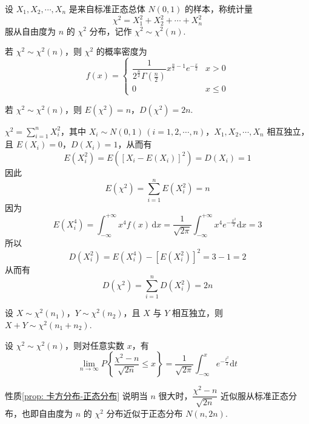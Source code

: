 \begin{definition} \label{def: 卡方分布}
    设 $X_1, X_2, \cdots, X_n$ 是来自标准正态总体 $N(0,1)$ 的样本，称统计量
    $$
    \chi^2 = X_1^2 + X_2^2 + \cdots + X_n^2
    $$
    服从自由度为 $n$ 的 $\chi^2$ 分布，记作 $\chi^2 \sim \chi^2(n)$.
\end{definition}

若 $\chi^2 \sim \chi^2(n)$，则 $\chi^2$ 的概率密度为
$$
f(x) = \begin{cases}
    \dfrac{1}{2^{\frac{n}{2}} \Gamma(\frac{n}{2})} x^{\frac{n}{2} - 1} e^{-\frac{x}{2}} & x>0 \\
    0 & x \leqslant 0
\end{cases}
$$

\setcounter{propertyname}{0}

\begin{property} \label{prop:卡方分布的数学期望和方差}
    若 $\chi^2 \sim \chi^2(n)$，则 $E(\chi^2) = n$，$D(\chi^2) = 2n$.
\end{property}

\begin{myproof}
    $\chi^2 = \displaystyle\sum_{i=1}^n X_i^2$，其中 $X_i \sim N(0,1) \, (i=1,2,\cdots,n)$，$X_1, X_2, \cdots, X_n$ 相互独立，且 $E(X_i) = 0$，$D(X_i) = 1$，从而有
    $$
    E(X_i^2) = E([X_i - E(X_i)]^2) = D(X_i) = 1
    $$
    因此
    $$
    E(\chi^2) = \sum_{i=1}^n E(X_i^2) = n
    $$
    因为
    $$
    E(X_i^4) = \int_{-\infty}^{+\infty} x^4 f(x) \, \text{d}x = \dfrac{1}{\sqrt{2 \pi}} \int_{-\infty}^{+\infty} x^4 e^{-\frac{x^2}{2}} \text{d}x = 3
    $$
    所以
    $$
    D(X_i^2) = E(X_i^4) - [E(X_i^2)]^2 = 3-1 = 2
    $$
    从而有
    $$
    D(\chi^2) = \sum_{i=1}^n D(X_i^2) = 2n
    $$
\end{myproof}

\begin{property}[（可加性）]
    设 $X \sim \chi^2(n_1)$，$Y \sim \chi^2(n_2)$，且 $X$ 与 $Y$ 相互独立，则 $X+Y \sim \chi^2(n_1 + n_2)$.
\end{property}

\begin{property} \label{prop: 卡方分布-正态分布}
    设 $\chi^2 \sim \chi^2(n)$，则对任意实数 $x$，有
    $$
    \lim_{n \to \infty} P \left\{ \dfrac{\chi^2 - n}{\sqrt{2n}} \leqslant x \right\} = \dfrac{1}{\sqrt{2 \pi}} \int_{-\infty}^{x} e^{-\frac{t^2}{2}} \text{d}t
    $$
\end{property}

性质\ref*{prop: 卡方分布-正态分布} 说明当 $n$ 很大时，$\dfrac{\chi^2 - n}{\sqrt{2n}}$ 近似服从标准正态分布，也即自由度为 $n$ 的 $\chi^2$ 分布近似于正态分布 $N(n,2n)$.


